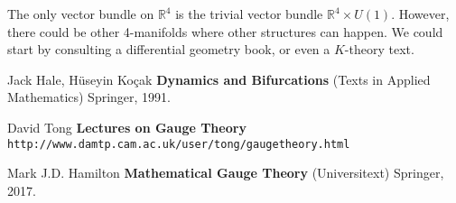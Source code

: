 \documentclass[12pt]{article}
\begin{document}
The only vector bundle on $\mathbb{R}^4$ is the trivial vector bundle $\mathbb{R}^4 \times U(1)$.  However, there could be other 4-manifolds where other structures can happen.  We could start by consulting a differential geometry book, or even a $K$-theory text.
\vfill
\begin{thebibliography}{} 

\item Jack Hale, H\"{u}seyin Ko\c{c}ak \textbf{Dynamics and Bifurcations} (Texts in Applied Mathematics) Springer, 1991.

\item David Tong \textbf{Lectures on Gauge Theory} \texttt{http://www.damtp.cam.ac.uk/user/tong/gaugetheory.html}

\item Mark J.D. Hamilton \textbf{Mathematical Gauge Theory} (Universitext) Springer, 2017.

\end{thebibliography}
\end{document}
